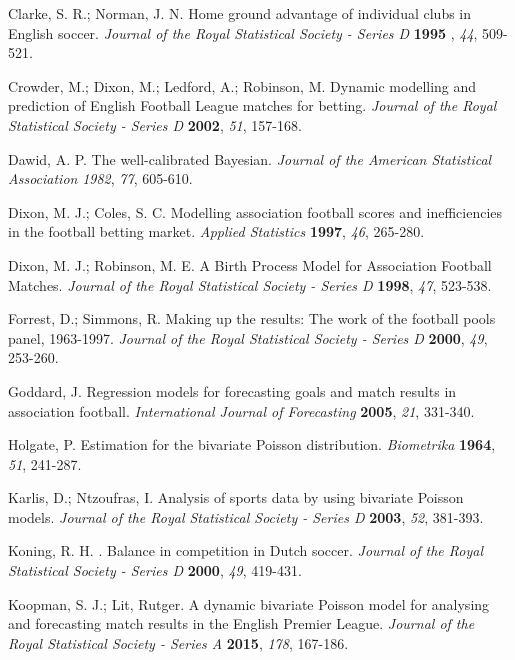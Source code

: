 \documentclass[journal,article,accept,moreauthors,pdftex,12pt,a4paper]{mdpi}
\begin{document}
{\begin{thebibliography}{999}
        Clarke, S. R.; Norman, J. N. Home ground advantage of individual clubs in English soccer. {\em Journal of the Royal Statistical Society - Series D} {\bf 1995} ,
        {\em 44}, 509-521.

         Crowder, M.; Dixon, M.; Ledford, A.; Robinson, M. Dynamic modelling and prediction of English
        Football League matches for betting. {\em Journal of the Royal
            Statistical Society - Series D} {\bf 2002}, {\em 51}, 157-168.

         Dawid, A. P. The well-calibrated Bayesian.
        {\em Journal of the American Statistical Association} {\em 1982}, {\em 77}, 605-610.

         Dixon, M. J.; Coles, S. C. Modelling association football scores and inefficiencies in the football betting market. {\em Applied Statistics} {\bf 1997}, {\em 46}, 265-280.

         Dixon, M. J.; Robinson, M. E. A Birth Process Model for Association Football Matches. {\em Journal of the Royal Statistical Society - Series D}
        {\bf 1998}, {\em 47}, 523-538.

         Forrest, D.; Simmons, R. Making up the results: The work
        of the football pools panel, 1963-1997. {\em Journal of the Royal Statistical Society - Series D} {\bf 2000}, {\em 49}, 253-260.

        Goddard, J. Regression models for forecasting goals and match
        results in association football. {\em International Journal of
            Forecasting} {\bf 2005}, {\em 21}, 331-340.

        Holgate, P. Estimation for the bivariate Poisson distribution. {\em Biometrika} {\bf 1964}, {\em 51}, 241-287.

        Karlis, D.; Ntzoufras, I. Analysis of sports data by using bivariate
        Poisson models. {\em Journal of the Royal Statistical Society - Series D} {\bf 2003}, {\em 52}, 381-393.

        Koning, R. H. . Balance in competition in Dutch soccer. {\em Journal of the Royal Statistical Society - Series D} {\bf 2000}, {\em 49}, 419-431.

        Koopman, S. J.; Lit, Rutger. A dynamic bivariate Poisson model for
        analysing and forecasting match results in the English Premier
        League. {\em Journal of the Royal Statistical Society - Series A}
        {\bf 2015}, {\em 178}, 167-186.


\end{thebibliography}}
\end{document}
